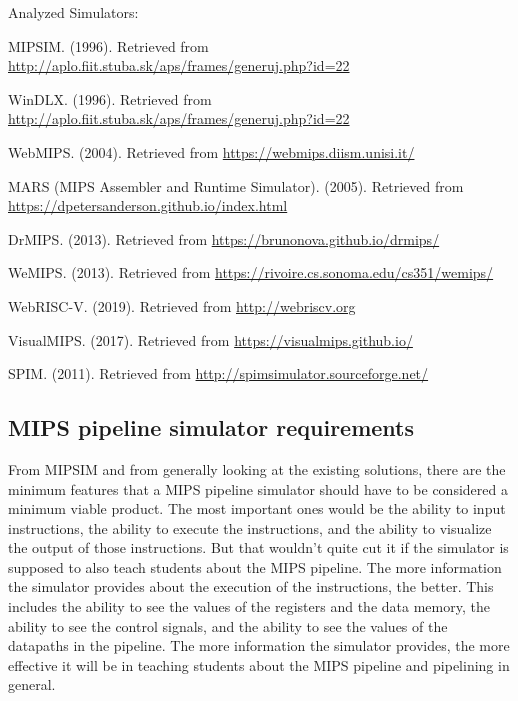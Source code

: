 Analyzed Simulators:
\begin{list}{-}{}
    \item MIPSIM\cite{grunbacher1996windlx}. (1996). Retrieved from \url{http://aplo.fiit.stuba.sk/aps/frames/generuj.php?id=22}
    \item WinDLX\cite{grunbacher1996windlx}. (1996). Retrieved from \url{http://aplo.fiit.stuba.sk/aps/frames/generuj.php?id=22}
    \item WebMIPS\cite{webmpis}. (2004). Retrieved from \url{https://webmips.diism.unisi.it/}
    \item MARS (MIPS Assembler and Runtime Simulator)\cite{mars}. (2005). Retrieved from \url{https://dpetersanderson.github.io/index.html}
    \item DrMIPS. (2013). Retrieved from \url{https://brunonova.github.io/drmips/}
    \item WeMIPS. (2013). Retrieved from \url{https://rivoire.cs.sonoma.edu/cs351/wemips/}
    \item WebRISC-V\cite{giorgi2019webriscv}. (2019). Retrieved from \url{http://webriscv.org}
    \item VisualMIPS\cite{visualmips}. (2017). Retrieved from \url{https://visualmips.github.io/}
    \item SPIM. (2011). Retrieved from \url{http://spimsimulator.sourceforge.net/}
\end{list}

\subsection{MIPS pipeline simulator requirements}\label{sec:mips_pipeline_simulator_requirements}

From MIPSIM and from generally looking at the existing solutions, there are the minimum features that a MIPS pipeline simulator should have to be considered a minimum viable product. The most important ones would be the ability to input instructions, the ability to execute the instructions, and the ability to visualize the output of those instructions. But that wouldn't quite cut it if the simulator is supposed to also teach students about the MIPS pipeline. The more information the simulator provides about the execution of the instructions, the better. This includes the ability to see the values of the registers and the data memory, the ability to see the control signals, and the ability to see the values of the datapaths in the pipeline. The more information the simulator provides, the more effective it will be in teaching students about the MIPS pipeline and pipelining in general.


